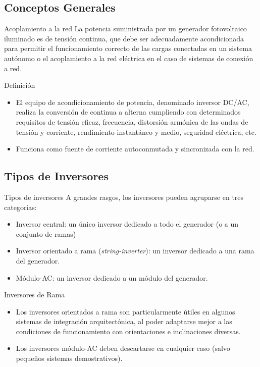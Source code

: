 \documentclass[xcolor={usenames,svgnames,dvipsnames}]{beamer}
\begin{document}
\subsection{Conceptos Generales}
\label{sec-2-1}
\begin{frame}[label=sec-2-1-1]{Acoplamiento a la red}
La potencia suministrada por un generador fotovoltaico iluminado es de
tensión continua, que debe ser adecuadamente acondicionada para permitir
el funcionamiento correcto de las cargas conectadas en un sistema
autónomo o el acoplamiento a la red eléctrica en el caso de sistemas de
conexión a red.
\end{frame}

\begin{frame}[label=sec-2-1-2]{Definición}
\begin{itemize}
\item El equipo de acondicionamiento de potencia, denominado inversor
DC/AC, realiza la conversión de continua a alterna cumpliendo con
determinados requisitos de tensión eficaz, frecuencia, distorsión
armónica de las ondas de tensión y corriente, rendimiento instantáneo
y medio, seguridad eléctrica, etc.

\item Funciona como fuente de corriente autoconmutada y sincronizada con la
red.
\end{itemize}
\end{frame}

\subsection{Tipos de Inversores}
\label{sec-2-2}
\begin{frame}[label=sec-2-2-1]{Tipos de inversores}
A grandes rasgos, los inversores pueden agruparse en tres categorías:

\begin{itemize}
\item \alert{Inversor central}: un único inversor dedicado a todo el generador (o
a un conjunto de ramas)

\item \alert{Inversor orientado a rama} (\emph{string-inverter}): un inversor dedicado
a una rama del generador.

\item \alert{Módulo-AC}: un inversor dedicado a un módulo del generador.
\end{itemize}
\end{frame}

\begin{frame}[label=sec-2-2-2]{Inversores de Rama}
\begin{itemize}
\item Los \alert{inversores orientados a rama} son particularmente útiles en
algunos sistemas de integración arquitectónica, al poder adaptarse
mejor a las condiciones de funcionamiento con orientaciones e
inclinaciones diversas.

\item Los inversores \alert{módulo-AC} deben descartarse en cualquier caso (salvo
pequeños sistemas demostrativos).
\end{itemize}
\end{frame}
\end{document}
